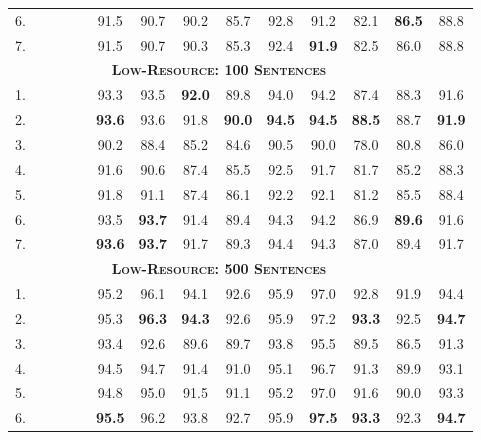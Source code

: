 \documentclass[11pt,a4paper]{article}
\newcommand{\cmark}{\textcolor{blue}{\ding{51}}}
\newcommand{\xmark}{\textcolor{red}{\ding{55}}}
\begin{document}
\begin{table*}[ht]
\begin{tabular}{l|cccc||cccccccc|c}
6. & \cmark & \cmark & \cmark & \xmark & 91.5 & 90.7 & 90.2 & 85.7 & 92.8 & 91.2 & 82.1 & \textbf{86.5} & 88.8 \\
7. & \cmark & \cmark & \cmark & \cmark & 91.5 & 90.7 & 90.3 & 85.3 & 92.4 & \textbf{91.9} & 82.5 & 86.0 & 88.8 \\
\hline\hline
\multicolumn{13}{c}{\bf \textsc{Low-Resource: 100 Sentences}}\\
\hline
1. & \xmark & \cmark & \xmark & \xmark & 93.3 & 93.5 & \textbf{92.0} & 89.8 & 94.0 & 94.2 & 87.4 & 88.3 & 91.6 \\
2. & \xmark & \cmark & \cmark & \xmark & \textbf{93.6} & 93.6 & 91.8 & \textbf{90.0} & \textbf{94.5} & \textbf{94.5} & \textbf{88.5} & 88.7 & \textbf{91.9} \\
3. & \cmark & \xmark & \xmark & \xmark & 90.2 & 88.4 & 85.2 & 84.6 & 90.5 & 90.0 & 78.0 & 80.8 & 86.0 \\
4. & \cmark & \xmark & \cmark & \xmark & 91.6 & 90.6 & 87.4 & 85.5 & 92.5 & 91.7 & 81.7 & 85.2 & 88.3 \\
5. & \cmark & \xmark & \cmark & \cmark & 91.8 & 91.1 & 87.4 & 86.1 & 92.2 & 92.1 & 81.2 & 85.5 & 88.4 \\
6. & \cmark & \cmark & \cmark & \xmark & 93.5 & \textbf{93.7} & 91.4 & 89.4 & 94.3 & 94.2 & 86.9 & \textbf{89.6} & 91.6 \\
7. & \cmark & \cmark & \cmark & \cmark & \textbf{93.6} & \textbf{93.7} & 91.7 & 89.3 & 94.4 & 94.3 & 87.0 & 89.4 & 91.7 \\
\hline\hline
\multicolumn{13}{c}{\bf \textsc{Low-Resource: 500 Sentences}}\\
\hline
1. & \xmark & \cmark & \xmark & \xmark & 95.2 & 96.1 & 94.1 & 92.6 & 95.9 & 97.0 & 92.8 & 91.9 & 94.4 \\
2. & \xmark & \cmark & \cmark & \xmark & 95.3 & \textbf{96.3} & \textbf{94.3} & 92.6 & 95.9 & 97.2 & \textbf{93.3} & 92.5 & \textbf{94.7} \\
3. & \cmark & \xmark & \xmark & \xmark & 93.4 & 92.6 & 89.6 & 89.7 & 93.8 & 95.5 & 89.5 & 86.5 & 91.3 \\
4. & \cmark & \xmark & \cmark & \xmark & 94.5 & 94.7 & 91.4 & 91.0 & 95.1 & 96.7 & 91.3 & 89.9 & 93.1 \\
5. & \cmark & \xmark & \cmark & \cmark & 94.8 & 95.0 & 91.5 & 91.1 & 95.2 & 97.0 & 91.6 & 90.0 & 93.3 \\
6. & \cmark & \cmark & \cmark & \xmark & \textbf{95.5} & 96.2 & 93.8 & 92.7 & 95.9 & \textbf{97.5} & \textbf{93.3} & 92.3 & \textbf{94.7} \\

\end{tabular}
\end{table*}
\end{document}
